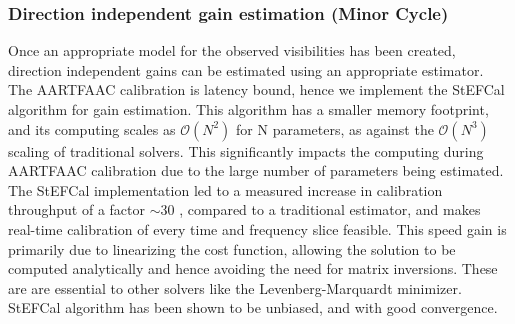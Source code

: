 \documentclass{aa}
\begin{document}
\begin{table}[tbh]
\caption{Details of model sources used for All-sky selfcalibration}
\label{tab:Details-of-model}
\end{table}

\subsubsection{\label{sub:Direction-independent-gain}Direction independent gain
estimation (Minor Cycle)}

Once  an appropriate  model  for  the observed  visibilities  has been  created,
direction independent gains can be estimated using an appropriate estimator. The
AARTFAAC   calibration    is   latency    bound,   hence   we    implement   the
StEFCal \citep{salvini2013stef}  algorithm for  gain estimation.   This algorithm
has a smaller memory footprint, and its computing scales as $\mathcal{O}(N^{2})$
for  N parameters, as  against the  $\mathcal{O}(N^{3})$ scaling  of traditional
solvers. This  significantly impacts  the computing during  AARTFAAC calibration
due  to   the  large  number   of  parameters  being  estimated.    The  StEFCal
implementation led to a measured increase in  calibration throughput of a factor
$\sim$30 \citep{salvini2013stef}, compared to a traditional estimator, and  makes
real-time calibration  of every time  and frequency slice feasible.   This speed
gain is primarily due to linearizing the cost function, allowing the solution to
be  computed analytically  and hence  avoiding the  need for  matrix inversions.
These are are essential to other solvers like the Levenberg-Marquardt minimizer.
StEFCal algorithm has been shown to be unbiased, and with good convergence.
\end{document}
